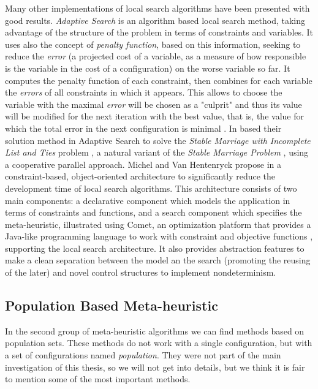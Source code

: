 Many other implementations of local search algorithms have been presented with good results. {\it Adaptive Search} is an algorithm based local search method, taking advantage of the structure of the problem in terms of constraints and variables. It uses also the concept of \textit{penalty function}, based on this information, seeking to reduce the \textit{error} (a projected cost of a variable, as a measure of how responsible is the variable in the cost of a configuration) on the worse variable so far. It computes the penalty function of each constraint, then combines for each variable the \textit{errors} of all constraints in which it appears. This allows to choose the variable with the maximal \textit{error} will be chosen as a "culprit" and thus its value will be modified for the next iteration with the best value, that is, the value for which the total error in the next configuration is minimal \cite{Diaz, Codognet2001, Caniou14}. In \cite{Munera2015}  based their solution method in Adaptive Search to solve the \textit{Stable Marriage with Incomplete List and Ties} problem \cite{Iwama1999}, a natural variant of the \textit{Stable Marriage Problem} \cite{Gale1962}, using a cooperative parallel approach. Michel and Van Hentenryck propose in \cite{Michel2002} a constraint-based, object-oriented architecture to significantly reduce the development time of local search algorithms. This architecture consists of two main components: a declarative component which models the application in terms of constraints and functions, and a search component which specifies the meta-heuristic, illustrated using {\sc Comet}, an optimization platform that provides a Java-like programming language to work with constraint and objective functions \cite{Comet, Michel2005}, supporting the local search architecture. It also provides abstraction features to make a clean separation between the model an the search (promoting the reusing of the later) and novel control structures to implement nondeterminism.

\subsection{Population Based Meta-heuristic}

In the second group of meta-heuristic algorithms we can find methods based on population sets. These methods do not work with a single configuration, but with a set of configurations named {\it population}. They were not part of the main investigation of this thesis, so we will not get into details, but we think it is fair to mention some of the most important methods.


